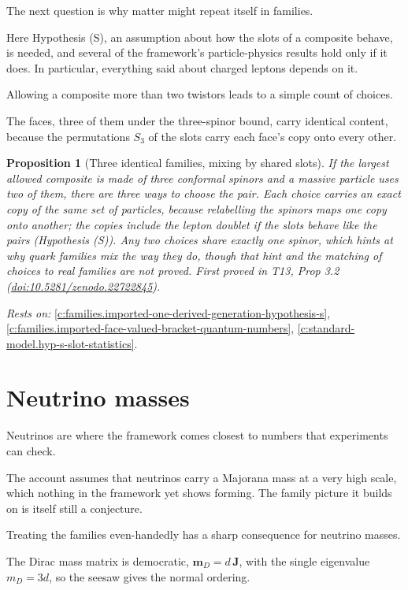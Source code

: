 \documentclass[11pt]{article}
\newtheorem{proposition}[theorem]{Proposition}
\theoremstyle{definition}
\theoremstyle{plain}
\providecommand{\J}{}\renewcommand{\J}{\mathbf{J}}
\providecommand{\mD}{}\renewcommand{\mD}{\mathbf{m}_{D}}
\begin{document}
The next question is why matter might repeat itself in families.

Here Hypothesis (S), an assumption about how the slots of a composite behave, is needed, and several of the framework's particle-physics results hold only if it does. In particular, everything said about charged leptons depends on it.

Allowing a composite more than two twistors leads to a simple count of choices.

The faces, three of them under the three-spinor bound, carry identical content, because the permutations $S_{3}$ of the slots carry each face's copy onto every other.

\begin{proposition}[Three identical families, mixing by shared slots]\label{c:families.three-identical-families-mixing-shared-slots}
If the largest allowed composite is made of three conformal spinors and a massive particle uses two of them, there are three ways to choose the pair. Each choice carries an exact copy of the same set of particles, because relabelling the spinors maps one copy onto another; the copies include the lepton doublet if the slots behave like the pairs (Hypothesis (S)). Any two choices share exactly one spinor, which hints at why quark families mix the way they do, though that hint and the matching of choices to real families are not proved.
\emph{First proved in} T13, Prop 3.2 (\href{https://doi.org/10.5281/zenodo.22722845}{doi:10.5281/zenodo.22722845}).
\end{proposition}
\noindent\emph{Rests on:} \ref{c:families.imported-one-derived-generation-hypothesis-s}, \ref{c:families.imported-face-valued-bracket-quantum-numbers}, \ref{c:standard-model.hyp-s-slot-statistics}.

\section{Neutrino masses}

Neutrinos are where the framework comes closest to numbers that experiments can check.

The account assumes that neutrinos carry a Majorana mass at a very high scale, which nothing in the framework yet shows forming. The family picture it builds on is itself still a conjecture.

Treating the families even-handedly has a sharp consequence for neutrino masses.

The Dirac mass matrix is democratic, $\mD = d\,\J$, with the single eigenvalue $m_{D} = 3d$, so the seesaw gives the normal ordering.
\end{document}
